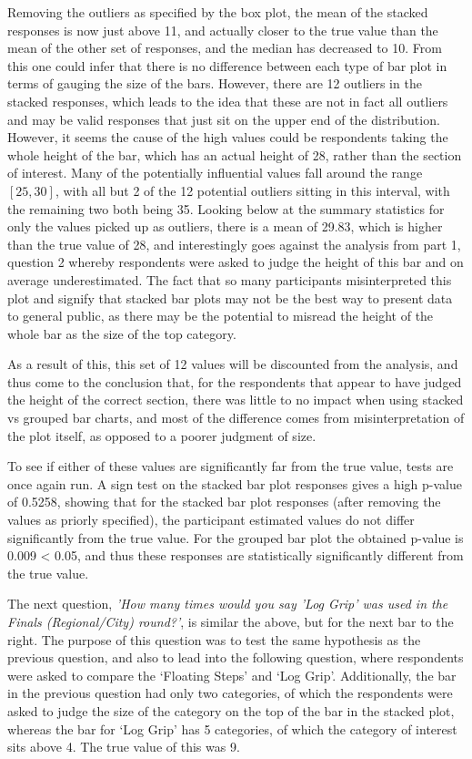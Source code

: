 \documentclass[
  11pt,
]{book}
\begin{document}
Removing the outliers as specified by the box plot, the mean of the
stacked responses is now just above 11, and actually closer to the true
value than the mean of the other set of responses, and the median has
decreased to 10. From this one could infer that there is no difference
between each type of bar plot in terms of gauging the size of the bars.
However, there are 12 outliers in the stacked responses, which leads to
the idea that these are not in fact all outliers and may be valid
responses that just sit on the upper end of the distribution. However,
it seems the cause of the high values could be respondents taking the
whole height of the bar, which has an actual height of 28, rather than
the section of interest. Many of the potentially influential values fall
around the range \([25, 30]\), with all but 2 of the 12 potential
outliers sitting in this interval, with the remaining two both being 35.
Looking below at the summary statistics for only the values picked up as
outliers, there is a mean of 29.83, which is higher than the true value
of 28, and interestingly goes against the analysis from part 1, question
2 whereby respondents were asked to judge the height of this bar and on
average underestimated. The fact that so many participants
misinterpreted this plot and signify that stacked bar plots may not be
the best way to present data to general public, as there may be the
potential to misread the height of the whole bar as the size of the top
category.

As a result of this, this set of 12 values will be discounted from the
analysis, and thus come to the conclusion that, for the respondents that
appear to have judged the height of the correct section, there was
little to no impact when using stacked vs grouped bar charts, and most
of the difference comes from misinterpretation of the plot itself, as
opposed to a poorer judgment of size.

To see if either of these values are significantly far from the true
value, tests are once again run. A sign test on the stacked bar plot
responses gives a high p-value of 0.5258, showing that for the stacked
bar plot responses (after removing the values as priorly specified), the
participant estimated values do not differ significantly from the true
value. For the grouped bar plot the obtained p-value is 0.009
\textless{} 0.05, and thus these responses are statistically
significantly different from the true value.

The next question,
\textit{'How many times would you say 'Log Grip' was used in the Finals (Regional/City) round?'},
is similar the above, but for the next bar to the right. The purpose of
this question was to test the same hypothesis as the previous question,
and also to lead into the following question, where respondents were
asked to compare the `Floating Steps' and `Log Grip'. Additionally, the
bar in the previous question had only two categories, of which the
respondents were asked to judge the size of the category on the top of
the bar in the stacked plot, whereas the bar for `Log Grip' has 5
categories, of which the category of interest sits above 4. The true
value of this was 9.
\end{document}
